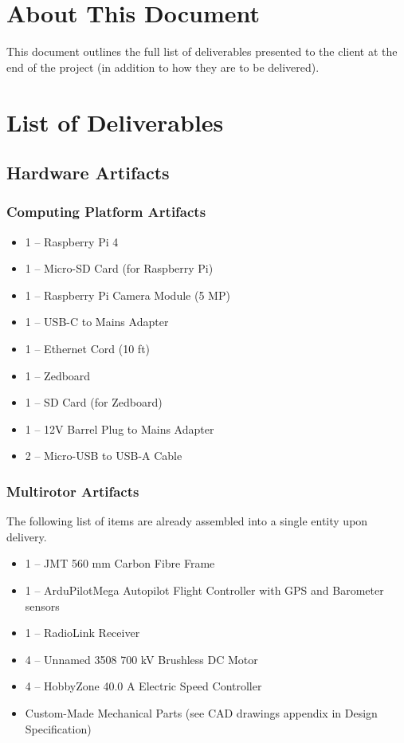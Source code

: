 \documentclass[10pt,letterpaper]{article}
\begin{document}

\section{About This Document}
This document outlines the full list of deliverables presented to the client at the end of the project (in addition to how they are to be delivered).

\section{List of Deliverables}
\label{list}
\subsection{Hardware Artifacts}
\subsubsection{Computing Platform Artifacts}
\begin{itemize}
\item 1 -- Raspberry Pi 4
\item 1 -- Micro-SD Card (for Raspberry Pi)
\item 1 -- Raspberry Pi Camera Module (5 MP)
\item 1 -- USB-C to Mains Adapter
\item 1 -- Ethernet Cord (10 ft)
\item 1 -- Zedboard
\item 1 -- SD Card (for Zedboard)
\item 1 -- 12V Barrel Plug to Mains Adapter
\item 2 -- Micro-USB to USB-A Cable
\end{itemize}

\subsubsection{Multirotor Artifacts}

The following list of items are already assembled into a single entity upon delivery. 

\begin{itemize}
\item 1 -- JMT 560 mm Carbon Fibre Frame
\item 1 -- ArduPilotMega Autopilot Flight Controller with GPS and Barometer sensors
\item 1 -- RadioLink Receiver
\item 4 -- Unnamed 3508 700 kV Brushless DC Motor
\item 4 -- HobbyZone 40.0 A Electric Speed Controller
\item Custom-Made Mechanical Parts (see CAD drawings appendix in Design Specification)
\end{itemize}
\end{document}
